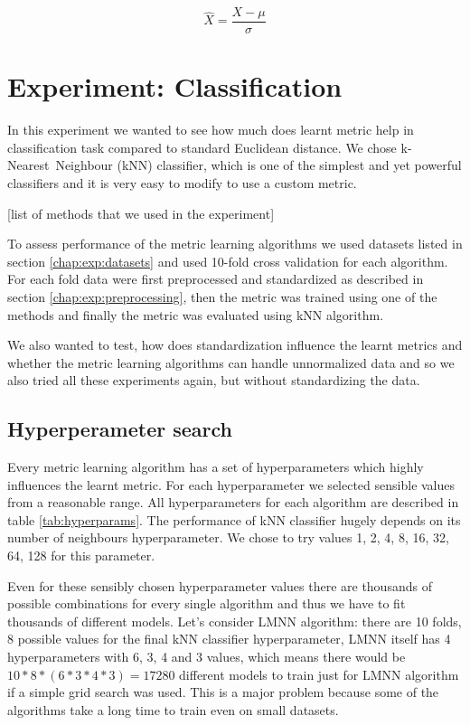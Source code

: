 \documentclass[12pt,a4paper]{report}
\begin{document}
\begin{equation} \label{eq:stand}
\hat{X} = \frac{X-\mu}{\sigma}
\end{equation}

\section{Experiment: Classification} \label{chap:exp:classification}

In this experiment we wanted to see how much does learnt metric help in classification task compared to standard Euclidean distance. We chose k-Nearest~Neighbour (kNN) classifier, which is one of the simplest and yet powerful classifiers and it is very easy to modify to use a custom metric.

[list of methods that we used in the experiment] %

To assess performance of the metric learning algorithms we used datasets listed in section \ref{chap:exp:datasets} and used 10-fold cross validation for each algorithm. For each fold data were first preprocessed and standardized as described in section \ref{chap:exp:preprocessing}, then the metric was trained using one of the methods and finally the metric was evaluated using kNN algorithm.

We also wanted to test, how does standardization influence the learnt metrics and whether the metric learning algorithms can handle unnormalized data and so we also tried all these experiments again, but without standardizing the data.

\subsection{Hyperperameter search}

Every metric learning algorithm has a set of hyperparameters which highly influences the learnt metric. For each hyperparameter we selected sensible values from a reasonable range. All hyperparameters for each algorithm are described in table \ref{tab:hyperparams}. The performance of kNN classifier hugely depends on its number of neighbours hyperparameter. We chose to try values 1, 2, 4, 8, 16, 32, 64, 128 for this parameter.



Even for these sensibly chosen hyperparameter values there are thousands of possible combinations for every single algorithm and thus we have to fit thousands of different models. Let’s consider LMNN algorithm: there are 10 folds, 8 possible values for the final kNN classifier hyperparameter, LMNN itself has 4 hyperparameters with 6, 3, 4 and 3 values, which means there would be $10*8*(6*3*4*3)=17280$ different models to train just for LMNN algorithm if a simple grid search was used. This is a major problem because some of the algorithms take a long time to train even on small datasets.
\end{document}
